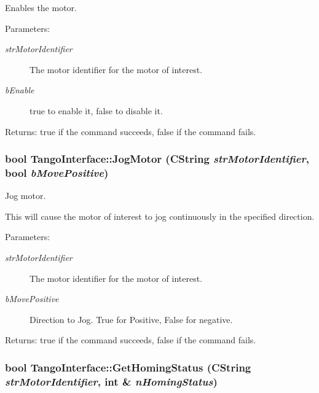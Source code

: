 Enables the motor. 

\begin{Desc}
\item[Parameters:]
\begin{description}
\item[{\em strMotorIdentifier}]The motor identifier for the motor of interest.\item[{\em bEnable}]true to enable it, false to disable it. \end{description}
\end{Desc}


\begin{Desc}
\item[Returns:]true if the command succeeds, false if the command fails. \end{Desc}
\hypertarget{classTangoInterface_ab781c1b152882cff163edd81407033f}{
\subsubsection[JogMotor]{\setlength{\rightskip}{0pt plus 5cm}bool TangoInterface::JogMotor (CString {\em strMotorIdentifier}, \/  bool {\em bMovePositive})}}
\label{classTangoInterface_ab781c1b152882cff163edd81407033f}


Jog motor. 

This will cause the motor of interest to jog continuously in the specified direction.

\begin{Desc}
\item[Parameters:]
\begin{description}
\item[{\em strMotorIdentifier}]The motor identifier for the motor of interest.\item[{\em bMovePositive}]Direction to Jog. True for Positive, False for negative. \end{description}
\end{Desc}


\begin{Desc}
\item[Returns:]true if the command succeeds, false if the command fails. \end{Desc}
\hypertarget{classTangoInterface_98190a21946b4aa04b7d4b12ababa768}{
\subsubsection[GetHomingStatus]{\setlength{\rightskip}{0pt plus 5cm}bool TangoInterface::GetHomingStatus (CString {\em strMotorIdentifier}, \/  int \& {\em nHomingStatus})}}
\label{classTangoInterface_98190a21946b4aa04b7d4b12ababa768}


